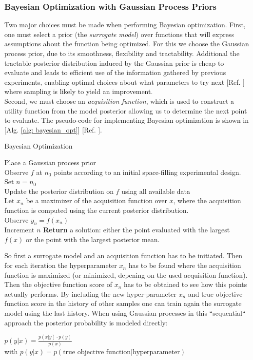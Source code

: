 \documentclass[12pt, a4paper]{article}
\begin{document}
\subsubsection{Bayesian Optimization with Gaussian Process Priors}
Two major choices must be made when performing Bayesian optimization. First, one must select a prior (the \textit{surrogate model}) over functions that will express assumptions about the function being optimized. For this we choose the Gaussian process prior, due to its smoothness, flexibility and tractability. Additional the tractable posterior distribution induced by the Gaussian prior is cheap to evaluate and leads to efficient use of the information gathered by previous experiments, enabling optimal choices about what parameters to try next [Ref. \cite{Snoek2012}] where sampling is likely to yield an improvement. \\
Second, we must choose an \textit{acquisition function}, which is used to construct a utility function from the model posterior allowing us to determine the next point to evaluate. The pseudo-code for implementing Bayesian optimization is shown in [Alg. \ref{alg: bayesian_opt}] [Ref. \cite{Frazier2018}].
\begin{algorithm}
\caption{Bayesian Optimization \cite{Frazier2018}}
    \label{alg: bayesian_opt}
    Place a Gaussian process prior \\
    Observe $f$ at $n_0$ points according to an initial space-filling experimental design. \\
    Set $n = n_0$ \\
    {
    Update the posterior distribution on $f$ using all available data \\
    Let $x_n$ be a maximizer of the acquisition function over $x$, where the acquisition function is computed using the current posterior distribution.\\
    Observe $y_n = f(x_n)$ \\
    Increment $n$
    }
    \textbf{Return} a solution: either the point evaluated with the largest $f(x)$ or the point with the largest posterior mean.
\end{algorithm}
So first a surrogate model and an acquisition function has to be initiated. Then for each iteration the hyperparameter $x_n$ has to be found where the acquisition function is maximized (or minimized, depening on the used acquisition function). Then the objective function score of $x_n$ has to be obtained to see how this points actually performs. By including the new hyper-parameter $x_n$ and true objective function score in the history of other samples one can train again the surrogate model using the last history. When using Gaussian processes in this ``sequential`` approach the posterior probability is modeled directly:
\begin{center}
    $p(y|x) = \frac{p(x|y) \cdot p(y)}{p(x)}$ \\
    with $ p(y|x) = p(\text{true objective function} | \text{hyperparameter})$
\end{center}
\end{document}

